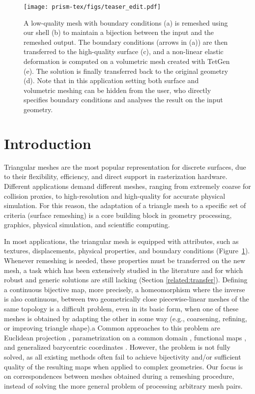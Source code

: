 
\begin{figure}
	\centering
	\texttt{[image: prism-tex/figs/teaser\_edit.pdf]}
    \caption{A low-quality mesh with boundary conditions (a)
    is remeshed using our shell (b)
    to maintain a bijection between the input and the remeshed output.
    The boundary conditions (arrows in (a)) are then transferred to the high-quality surface (c),
    and a non-linear elastic deformation is computed %
    on a volumetric mesh created with TetGen ({e}).
    The solution is finally transferred back to the original geometry ({d}).
    Note that in this application setting both surface and volumetric meshing {can be hidden from} the user, {who} directly specifies boundary conditions and analyses the result on the input geometry.}
    
    \label{prism:fig:teaser}
\end{figure}

\section{Introduction}
\label{prism:sec:introduction}

Triangular meshes are the most popular representation for discrete surfaces, due to their flexibility, efficiency, and direct support in rasterization hardware. Different applications demand different meshes, ranging from extremely coarse for collision proxies, to high-resolution and high-quality for accurate physical simulation.
%
For this reason, the adaptation of a triangle mesh to a specific set of criteria (surface remeshing) is a core building block in geometry processing, graphics, physical simulation, and scientific computing.

In most applications, the triangular mesh is equipped with attributes, such as textures, displacements, physical properties, and boundary conditions (Figure~\ref{prism:fig:teaser}). 
Whenever remeshing is needed, these properties must be transferred on the new mesh, a task which has been extensively studied in the literature and for which robust and generic solutions are still lacking (Section \ref{related:transfer}). 
Defining a {continuous} bijective map, {more precisely, a homeomorphism where the inverse is also continuous,} between two {geometrically close}  piecewise-linear meshes of the same topology is a difficult problem, even in its basic form, when one of these meshes is obtained by adapting the other in some way (e.g., coarsening, refining, or improving triangle shape).a
Common approaches to this problem are Euclidean projection
\cite{jiao2004overlaying}, parametrization on a common domain \cite{praun2001consistent,kraevoy2004cross,lee1998maps}, functional maps \cite{Ovsjanikov:2012}, and generalized barycentric coordinates \cite{Hormann:2017:GBC}.  However, the problem is not fully solved, as all existing methods
 often fail to achieve bijectivity and/or sufficient quality of the resulting maps when applied to complex geometries. %
{Our focus is on correspondences between meshes obtained during a remeshing procedure, instead of solving the more general problem of processing arbitrary mesh pairs.}

